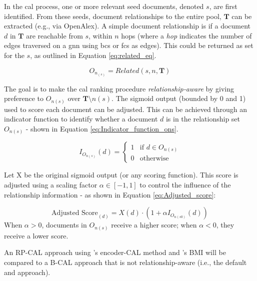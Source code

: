 \documentclass[10pt,oneside]{book}
\begin{document}
In the \gls*{cal} process, one or more relevant seed documents, denoted $s$, are first identified. From these seeds, document relationships to the entire pool, $\textbf{T}$ can be extracted (e.g., via OpenAlex). A simple document relationship is if a document $d$ in $\textbf{T}$ are reachable from $s$, within $n$ hops (where a \emph{hop} indicates the number of edges traversed on a \gls*{gnn} using \gls*{bcs} or \gls*{fcs} as edges). This could be returned as set for the $s$, as outlined in Equation \ref{eq:related_eq}.

\begin{equation}
    O_{n_{(s)}} = Related(s, n,\textbf{T})
   \label{eq:related_eq} 
\end{equation}

The goal is to make the \gls*{cal} ranking procedure \emph{relationship‐aware} by giving preference to $O_{n(s)}$ over $\textbf{T} \setminus {n(s)} $. The sigmoid output (bounded by 0 and 1) used to score each document can be adjusted. This can be achieved through an indicator function to identify whether a document $d$ is in the relationship set $O_{n(s)}$ - shown in Equation \ref{eq:Indicator_function_ons}.

\begin{equation}
    {I_{O_{n(s)}}(d) = \begin{cases}
1 & \text{if } d \in O_{n(s)} \\
0 & \text{otherwise }
\end{cases}}
\label{eq:Indicator_function_ons}
\end{equation}

Let X be the original sigmoid output (or any scoring function). This score is adjusted using a scaling factor $\alpha \in [-1, 1]$ to control the influence of the relationship information - as shown in Equation \ref{eq:Adjusted_score}:

\begin{equation}
\text{Adjusted Score}_{(d)} = X(d) \cdot(1+\alpha I_{O_{n{(s0)}}}(d))
\label{eq:Adjusted_score}
\end{equation}
When $\alpha > 0$, documents in $O_{n(s)}$ receive a higher score; when $\alpha < 0$, they receive a lower score.

An RP-CAL approach using \cite{mao_reproducibility_2024}'s encoder-CAL method and \cite{cormack_scalability_2016}'s BMI will be compared to a B-CAL approach that is not relationship-aware (i.e., the default \cite{mao_reproducibility_2024} and \cite{cormack_scalability_2016} approach).   
\end{document}

